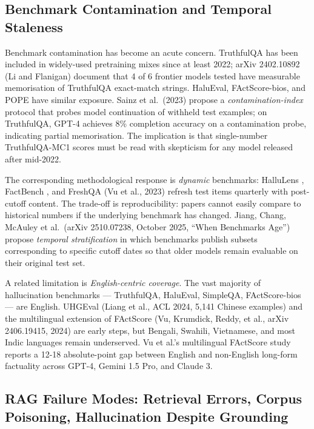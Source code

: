 \documentclass{article}
\begin{document}
\subsection{Benchmark Contamination and Temporal Staleness}\label{benchmark-contamination-and-temporal-staleness}

Benchmark contamination has become an acute concern. TruthfulQA \citep{lin2022truthfulqameasurin} has been included in widely-used pretraining mixes since at least 2022; arXiv 2402.10892 (Li and Flanigan) document that 4 of 6 frontier models tested have measurable memorisation of TruthfulQA exact-match strings. HaluEval, FActScore-bios, and POPE have similar exposure. Sainz et al.~(2023) propose a \emph{contamination-index} protocol that probes model continuation of withheld test examples; on TruthfulQA, GPT-4 achieves 8\% completion accuracy on a contamination probe, indicating partial memorisation. The implication is that single-number TruthfulQA-MC1 scores must be read with skepticism for any model released after mid-2022.

The corresponding methodological response is \emph{dynamic} benchmarks: HalluLens \citep{bang2025hallulensllmhalluc}, FactBench \citep{bayat2024factbenchadynamicb}, and FreshQA (Vu et al., 2023) refresh test items quarterly with post-cutoff content. The trade-off is reproducibility: papers cannot easily compare to historical numbers if the underlying benchmark has changed. Jiang, Chang, McAuley et al.~(arXiv 2510.07238, October 2025, ``When Benchmarks Age'') propose \emph{temporal stratification} in which benchmarks publish subsets corresponding to specific cutoff dates so that older models remain evaluable on their original test set.

A related limitation is \emph{English-centric coverage}. The vast majority of hallucination benchmarks --- TruthfulQA, HaluEval, SimpleQA, FActScore-bios --- are English. UHGEval (Liang et al., ACL 2024, 5,141 Chinese examples) and the multilingual extension of FActScore (Vu, Krumdick, Reddy, et al., arXiv 2406.19415, 2024) are early steps, but Bengali, Swahili, Vietnamese, and most Indic languages remain underserved. Vu et al.'s multilingual FActScore study reports a 12-18 absolute-point gap between English and non-English long-form factuality across GPT-4, Gemini 1.5 Pro, and Claude 3.

\subsection{RAG Failure Modes: Retrieval Errors, Corpus Poisoning, Hallucination Despite Grounding}\label{rag-failure-modes-retrieval-errors-corpus-poisoning-hallucination-despite-grounding}
\end{document}
